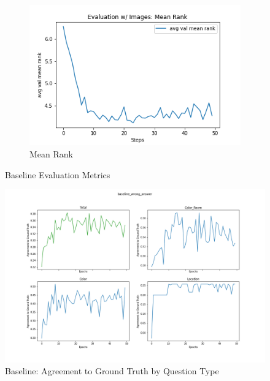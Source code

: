 \begin{figure}[H]
\begin{subfigure}[b]{0.3\textwidth}
         \includegraphics[width=\textwidth]{./figure/results/baseline_and_blindfolding/images/avg val mean rank.png}
         \caption{Mean Rank}
         \label{fig:baseline_mean_rank}
     \end{subfigure}
     \caption{Baseline Evaluation Metrics}
     \label{fig:baseline_metrics}
\end{figure}

\begin{figure}[H]
	\centering
	\includegraphics[width=\textwidth]{./figure/wrong_answers/baseline_wrong_answer.png}
	\caption{Baseline: Agreement to Ground Truth by Question Type}
	\label{fig:baseline_agreement}
\end{figure}


